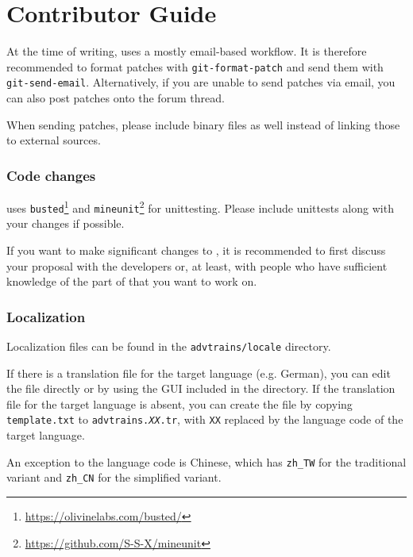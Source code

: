 \part{Contributor Guide}

At the time of writing, \advtrains{} uses a mostly email-based workflow. It is therefore recommended to format patches with \texttt{git-format-patch} and send them with \texttt{git-send-email}. Alternatively, if you are unable to send patches via email, you can also post patches onto the forum thread.

When sending patches, please include binary files as well instead of linking those to external sources.

\section{Code changes}
\advtrains{} uses \texttt{busted}\footnote{\url{https://olivinelabs.com/busted/}} and \texttt{mineunit}\footnote{\url{https://github.com/S-S-X/mineunit}} for unittesting. Please include unittests along with your changes if possible.

If you want to make significant changes to \advtrains{}, it is recommended to first discuss your proposal with the developers or, at least, with people who have sufficient knowledge of the part of \advtrains{} that you want to work on.

\section{Localization}
Localization files can be found in the \texttt{advtrains/locale} directory.

If there is a translation file for the target language (e.g. German), you can edit the file directly or by using the GUI included in the directory. If the translation file for the target language is absent, you can create the file by copying \texttt{template.txt} to \texttt{advtrains.\textit{XX}.tr}, with \texttt{XX} replaced by the language code of the target language.

An exception to the language code is Chinese, which has \texttt{zh\_TW} for the traditional variant and \texttt{zh\_CN} for the simplified variant.

